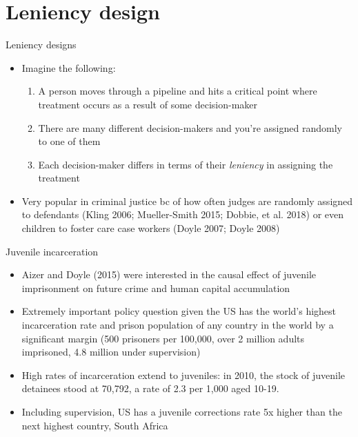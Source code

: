 \documentclass{beamer}
\begin{document}
\section{Leniency design}

\begin{frame}{Leniency designs}

	\begin{itemize}
	\item Imagine the following:
		\begin{enumerate}
		\item A person moves through a pipeline and hits a critical point where treatment occurs as a result of some decision-maker
		\item There are many different decision-makers and you're assigned randomly to one of them
		\item Each decision-maker differs in terms of their \emph{leniency} in assigning the treatment
		\end{enumerate}
	\item Very popular in criminal justice bc of how often judges are randomly assigned to defendants (Kling 2006; Mueller-Smith 2015; Dobbie, et al. 2018) or even children to foster care case workers (Doyle 2007; Doyle 2008)
	\end{itemize}
\end{frame}


\begin{frame}{Juvenile incarceration}

	\begin{itemize}
	\item Aizer and Doyle (2015) were interested in the causal effect of juvenile imprisonment on future crime and human capital accumulation
	\item Extremely important policy question given the US has the world's highest incarceration rate and prison population of any country in the world by a significant margin (500 prisoners per 100,000, over 2 million adults imprisoned, 4.8 million under supervision)
	\item High rates of incarceration extend to juveniles: in 2010, the stock of juvenile detainees stood at 70,792, a rate of 2.3 per 1,000 aged 10-19. 
	\item Including supervision, US has a juvenile corrections rate 5x higher than the next highest country, South Africa
	\end{itemize}
	
\end{frame}
\end{document}
